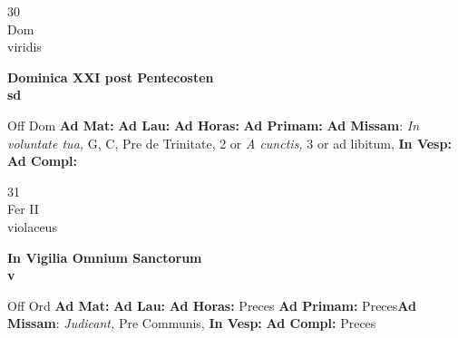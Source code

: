 \documentclass[10pt, openany]{book}
\begin{document}
    \begin{center}
        \begin{minipage}{3.5in}
            \vspace{2em}
            \begin{minipage}{0.5in}
                {\Huge 30} \\
                {\normalsize Dom} \\
                {\normalsize viridis}
            \end{minipage}
            \begin{minipage}{3.0in}
                \textbf{ \large Dominica XXI post Pentecosten \\
                \textnormal{\normalsize sd}} \\ 
            \end{minipage}
            \begin{justify}Off Dom
                \textbf{Ad Mat: }
                \textbf{Ad Lau: }
                \textbf{Ad Horas: }
                \textbf{Ad Primam: }\textbf{Ad Missam}: \textit{In voluntate tua,} G, C, Pre de Trinitate, 2 or \textit{A cunctis,} 3 or ad libitum,  
                \textbf{In Vesp: }
                \textbf{Ad Compl: }
            \end{justify}
        \end{minipage}
    \end{center}

    \begin{center}
        \begin{minipage}{3.5in}
            \vspace{2em}
            \begin{minipage}{0.5in}
                {\Huge 31} \\
                {\normalsize Fer II} \\
                {\normalsize violaceus}
            \end{minipage}
            \begin{minipage}{3.0in}
                \textbf{ \large In Vigilia Omnium Sanctorum \\
                \textnormal{\normalsize v}} \\ 
            \end{minipage}
            \begin{justify}Off Ord
                \textbf{Ad Mat: }
                \textbf{Ad Lau: }
                \textbf{Ad Horas: }Preces
                \textbf{Ad Primam: }Preces\textbf{Ad Missam}: \textit{Judicant,} Pre Communis,  
                \textbf{In Vesp: }
                \textbf{Ad Compl: }Preces
            \end{justify}
        \end{minipage}
    \end{center}
\end{document}

